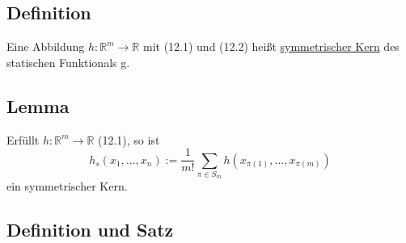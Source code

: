 \documentclass[german,10pt,oneside, fleqn, a4paper]{article}
\newcommand {\R}	{\mathbb{R}}
\newcommand{\ra}{\rightarrow}
\newcommand{\1}[1]{1_{#1}}
\newcommand{\2}[1]{\1{\brac{#1}}}
\begin{document}
\subsection{Definition}
\label{12.4}
Eine Abbildung $h:\R^m\ra\R$ mit (12.1) und (12.2) heißt \underline{symmetrischer Kern} des statischen Funktionals g.

\subsection{Lemma}
\label{12.5}
Erfüllt $h:\R^m\ra\R$ (12.1), so ist \[h_s(x_1,...,x_n):=\dfrac{1}{m!}\sum\limits_{\pi\in S_m}h(x_{\pi(1)},...,x_{\pi(m)})\]
ein symmetrischer Kern.

\subsection{Definition und Satz}
\label{12.6}
\end{document}
